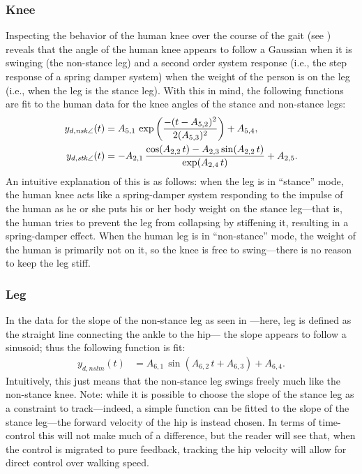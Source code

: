 \subsubsection{Knee} Inspecting the behavior of the human knee over the course of the gait (see ) reveals that the angle of the human knee appears to follow a Gaussian when it is swinging (the non-stance leg) and a second order system response (i.e., the step response of a spring damper system) when the weight of the person is on the leg (i.e., when the leg is the stance leg). With this in mind, the following functions are fit to the human data for the knee angles of the stance and non-stance legs:
\begin{align*}
  y_{d,\mathit{nsk}\angle}(t) &= A_{5,1} \, \exp\left(\frac{-(t-A_{5,2})^2}{2 (A_{5,3})^2}\right) + A_{5,4},\\
  y_{d,\mathit{stk}\angle}(t) &= -A_{2,1} \, \frac{\cos(A_{2,2}\,t)-A_{2,3} \sin(A_{2,2}\,t)}{\exp(A_{2,4} \, t)} + A_{2,5}.
\end{align*}
An intuitive explanation of this is as follows: when the leg is in ``stance'' mode, the human knee acts like a spring-damper system responding to the impulse of the human as he or she puts his or her body weight on the stance leg---that is, the human tries to prevent the leg from collapsing by stiffening it, resulting in a spring-damper effect. When the human leg is in ``non-stance'' mode, the weight of the human is primarily not on it, so the knee is free to swing---there is no reason to keep the leg stiff.

\subsubsection{Leg} In the data for the slope of the non-stance leg as seen in ---here, leg is defined as the straight line connecting the ankle to the hip--- the slope appears to follow a sinusoid; thus the following function is fit:
\begin{align*}
  y_{d,nslm}(t) &= A_{6,1} \, \sin(A_{6,2} \, t + A_{6,3}) + A_{6,4}.
\end{align*}
Intuitively, this just means that the non-stance leg swings freely much like the non-stance knee. Note: while it is possible to choose the slope of the stance leg as a constraint to track---indeed, a simple function can be fitted to the slope of the stance leg---the forward velocity of the hip is instead chosen. In terms of time-control this will not make much of a difference, but the reader will see that, when the control is migrated to pure feedback, tracking the hip velocity will allow for direct control over walking speed.

